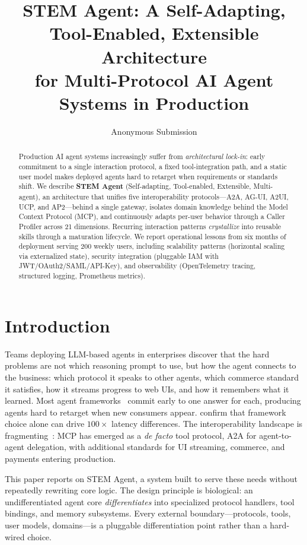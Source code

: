 \documentclass[11pt]{article}
\title{STEM Agent: A Self-Adapting, Tool-Enabled, Extensible Architecture\\
for Multi-Protocol AI Agent Systems in Production}
\author{Anonymous Submission}
\begin{document}
\maketitle

\begin{abstract}
Production AI agent systems increasingly suffer from \emph{architectural lock-in}: early commitment to a single interaction protocol, a fixed tool-integration path, and a static user model makes deployed agents hard to retarget when requirements or standards shift. We describe \textbf{STEM Agent} (Self-adapting, Tool-enabled, Extensible, Multi-agent), an architecture that unifies five interoperability protocols---A2A, AG-UI, A2UI, UCP, and AP2---behind a single gateway, isolates domain knowledge behind the Model Context Protocol (MCP), and continuously adapts per-user behavior through a Caller Profiler across 21 dimensions. Recurring interaction patterns \emph{crystallize} into reusable skills through a maturation lifecycle. We report operational lessons from six months of deployment serving 200 weekly users, including scalability patterns (horizontal scaling via externalized state), security integration (pluggable IAM with JWT/OAuth2/SAML/API-Key), and observability (OpenTelemetry tracing, structured logging, Prometheus metrics).
\end{abstract}

\section{Introduction}
\label{sec:intro}

Teams deploying LLM-based agents in enterprises discover that the hard problems are not which reasoning prompt to use, but how the agent connects to the business: which protocol it speaks to other agents, which commerce standard it satisfies, how it streams progress to web UIs, and how it remembers what it learned. Most agent frameworks~\citep{tran2025multiagent, ferrag2025agents} commit early to one answer for each, producing agents hard to retarget when new consumers appear. \citet{orogat2026mafbench} confirm that framework choice alone can drive $100\times$ latency differences. The interoperability landscape is fragmenting~\citep{ehtesham2025survey, li2025gluetoprotocols}: MCP has emerged as a \emph{de facto} tool protocol, A2A for agent-to-agent delegation, with additional standards for UI streaming, commerce, and payments entering production.

This paper reports on STEM Agent, a system built to serve these needs without repeatedly rewriting core logic. The design principle is biological: an undifferentiated agent core \emph{differentiates} into specialized protocol handlers, tool bindings, and memory subsystems. Every external boundary---protocols, tools, user models, domains---is a pluggable differentiation point rather than a hard-wired choice.
\end{document}

